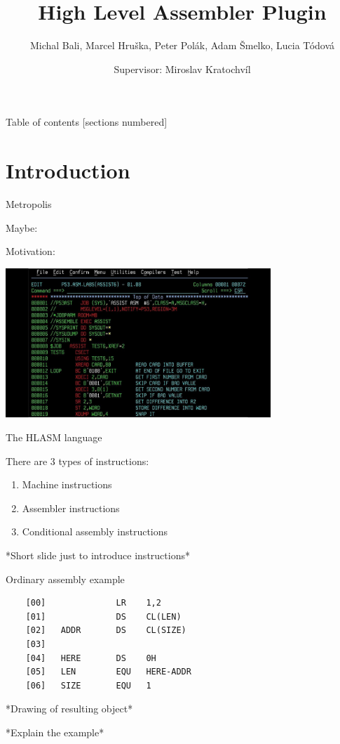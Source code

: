 \documentclass[10pt]{beamer}
\title{High Level Assembler Plugin}
\subtitle{}
\date{Supervisor: Miroslav Kratochvíl}
\author{Michal Bali, Marcel Hruška, Peter Polák, Adam Šmelko, Lucia Tódová}
\begin{document}
\maketitle

\begin{frame}{Table of contents}
  [sections numbered]
  \tableofcontents[hideallsubsections]
\end{frame}

\section{Introduction}

\begin{frame}[fragile]{Metropolis}

    Maybe:
    
    Motivation:
    
    \includegraphics[width=10cm]{img/maxresdefault}
    
  
\end{frame}

\begin{frame}[fragile]{The HLASM language}

There are 3 types of instructions:
\begin{enumerate}
	\item Machine instructions
	\item Assembler instructions
	\item Conditional assembly instructions
\end{enumerate}


*Short slide just to introduce instructions*

\end{frame}


\begin{frame}[fragile]{Ordinary assembly example}
  
	\begin{verbatim}
	[00]              LR    1,2
	[01]              DS    CL(LEN)
	[02]   ADDR       DS    CL(SIZE)
	[03]
	[04]   HERE       DS    0H
	[05]   LEN        EQU   HERE-ADDR
	[06]   SIZE       EQU   1
	\end{verbatim}
	
	*Drawing of resulting object*
	
	*Explain the example* 
\end{frame}
\end{document}
